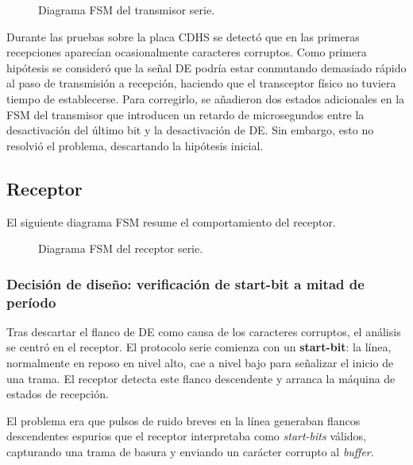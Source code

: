 \begin{figure}[H]
    \centering
    \caption{Diagrama FSM del transmisor serie.}
    \label{fig:fsm_tx}
\end{figure}

Durante las pruebas sobre la placa CDHS se detectó que en las primeras recepciones aparecían
ocasionalmente caracteres corruptos. Como primera hipótesis se consideró que la señal DE
podría estar conmutando demasiado rápido al paso de transmisión a recepción, haciendo que
el transceptor físico no tuviera tiempo de establecerse. Para corregirlo, se añadieron dos
estados adicionales en la FSM del transmisor que introducen un retardo de microsegundos
entre la desactivación del último bit y la desactivación de DE. Sin embargo, esto no resolvió
el problema, descartando la hipótesis inicial.

\subsection{Receptor}

El siguiente diagrama FSM resume el comportamiento del receptor.

\begin{figure}[H]
    \centering
    \caption{Diagrama FSM del receptor serie.}
    \label{fig:fsm_rx}
\end{figure}

\subsubsection{Decisión de diseño: verificación de start-bit a mitad de período}

Tras descartar el flanco de DE como causa de los caracteres corruptos, el análisis se centró
en el receptor. El protocolo serie comienza con un \textbf{start-bit}: la línea, normalmente en
reposo en nivel alto, cae a nivel bajo para señalizar el inicio de una trama. El receptor detecta
este flanco descendente y arranca la máquina de estados de recepción.

El problema era que pulsos de ruido breves en la línea generaban flancos descendentes
espurios que el receptor interpretaba como \textit{start-bits} válidos, capturando una trama de
basura y enviando un carácter corrupto al \textit{buffer}.

